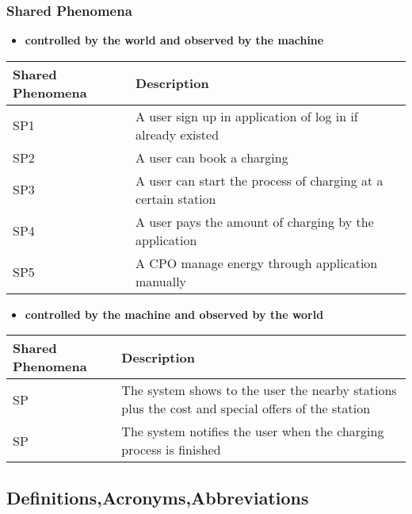 \documentclass{article}
\begin{document}
\subsubsection{Shared Phenomena}
\begin{itemize}
    \item \textbf{controlled by the world and observed by the machine}
\end{itemize}
\begin{tabularx}{1\textwidth} { 
  | >{\raggedright\arraybackslash}X 
  | >{\raggedright\arraybackslash}X
  | }
\hline

\textbf {Shared Phenomena } & \textbf{Description} \\
\hline
SP1 & A user sign up in application of log in if already existed\\
\hline
SP2 & A user can book a charging \\
\hline
SP3 & A user can start the process of charging at a certain station\\
\hline
SP4 & A user pays the amount of charging by the application\\
\hline
SP5 & A CPO manage energy through application manually\\
\hline


\end{tabularx}
\begin{itemize}
    \item \textbf{controlled by the machine and observed by the world}
\end{itemize}
\begin{tabularx}{1\textwidth} { 
  | >{\raggedright\arraybackslash}X 
  | >{\raggedright\arraybackslash}X
  | }
\hline

\textbf {Shared Phenomena } & \textbf{Description} \\
\hline
SP & The system shows to the user the nearby stations plus the cost and special offers of the station\\
\hline
SP & The system notifies the user when the charging process is finished\\
\hline



\end{tabularx}


\subsection{Definitions,Acronyms,Abbreviations}
\end{document}

